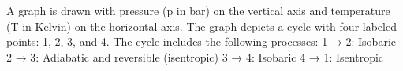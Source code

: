 A graph is drawn with pressure (p in bar) on the vertical axis and temperature (T in Kelvin) on the horizontal axis. The graph depicts a cycle with four labeled points: 1, 2, 3, and 4. The cycle includes the following processes:  
1 → 2: Isobaric  
2 → 3: Adiabatic and reversible (isentropic)  
3 → 4: Isobaric  
4 → 1: Isentropic